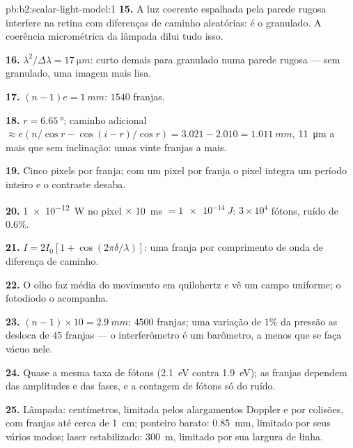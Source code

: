 \begin{solution}{pb:b2:scalar-light-model:1}
\textbf{15.} A luz coerente espalhada pela parede rugosa interfere na
retina com diferenças de caminho aleatórias: é o granulado. A coerência
micrométrica da lâmpada dilui tudo isso.

\textbf{16.} $\lambda^2/\Delta\lambda = \qty{17}{\micro m}$: curto demais para granulado numa
parede rugosa --- sem granulado, uma imagem mais lisa.

\textbf{17.} $(n - 1)e = \qty{1}{mm}$: $1540$ franjas.

\textbf{18.} $r = \qty{6.65}{\degree}$; caminho adicional $\approx e(n/\cos r - \cos(i - r)/\cos r)
= 3.021 - 2.010 = \qty{1.011}{mm}$, \qty{11}{\micro m} a mais que sem inclinação: umas
vinte franjas a mais.

\textbf{19.} Cinco pixels por franja; com um pixel por franja o pixel
integra um período inteiro e o contraste desaba.

\textbf{20.} \qty{1e-12}{W} no pixel $\times$ \qty{10}{ms} $= \qty{1e-14}{J}$: $3 \times 10^4$
fótons, ruído de $0.6\%$.

\textbf{21.} $I = 2I_0[1 + \cos(2\pi\delta/\lambda)]$: uma franja por comprimento de onda de
diferença de caminho.

\textbf{22.} O olho faz média do movimento em quilohertz e vê um campo
uniforme; o fotodiodo o acompanha.

\textbf{23.} $(n - 1) \times 10 = \qty{2.9}{mm}$: $4500$ franjas; uma variação de $1\%$ da
pressão as desloca de $45$ franjas --- o interferômetro é um
barômetro, a menos que se faça vácuo nele.

\textbf{24.} Quase a mesma taxa de fótons (\qty{2.1}{eV} contra \qty{1.9}{eV});
as franjas dependem das amplitudes e das fases, e a contagem de fótons só do
ruído.

\textbf{25.} Lâmpada: centímetros, limitada pelos alargamentos Doppler e por
colisões, com franjas até cerca de \qty{1}{cm}; ponteiro barato: \qty{0.85}{mm},
limitado por seus vários modos; laser estabilizado: \qty{300}{m}, limitado por
sua largura de linha.
\end{solution}
